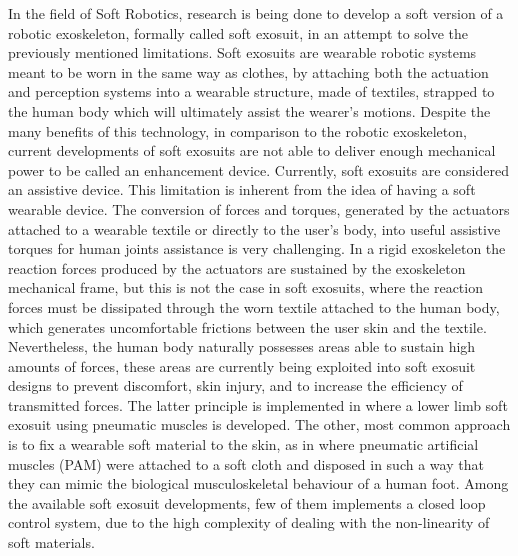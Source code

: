 In the field of Soft Robotics, research is being done to develop a soft version of a robotic exoskeleton, formally called soft exosuit, in an attempt to solve the previously mentioned limitations. Soft exosuits are wearable robotic systems meant to be worn in the same way as clothes, by attaching both the actuation and perception systems into a wearable structure, made of textiles, strapped to the human body which will ultimately assist the wearer's motions. Despite the many benefits of this technology, in comparison to the robotic exoskeleton, current developments of soft exosuits are not able to deliver enough mechanical power to be called an enhancement device. Currently, soft exosuits are considered an assistive device. This limitation is inherent from the idea of having a soft wearable device. The conversion of forces and torques, generated by the actuators attached to a wearable textile or directly to the user's body, into useful assistive torques for human joints assistance is very challenging. In a rigid exoskeleton the reaction forces produced by the actuators are sustained by the exoskeleton mechanical frame, but this is not the case in soft exosuits, where the reaction forces must be dissipated through the worn textile attached to the human body, which generates uncomfortable frictions between the user skin and the textile. Nevertheless, the human body naturally possesses areas able to sustain high amounts of forces, these areas are currently being exploited into soft exosuit designs to prevent discomfort, skin injury, and to increase the efficiency of transmitted forces. The latter principle is implemented in \cite{wehner2013lightweight} where a lower limb soft exosuit using pneumatic muscles is developed. The other, most common approach is to fix a wearable soft material to the skin, as in \cite{park2014design,park2011bio} where pneumatic artificial muscles (PAM) were attached to a soft cloth and disposed in such a way that they can mimic the biological musculoskeletal behaviour of a human foot. Among the available soft exosuit developments, few of them implements a closed loop control system, due to the high complexity of dealing with the non-linearity of soft materials. 

